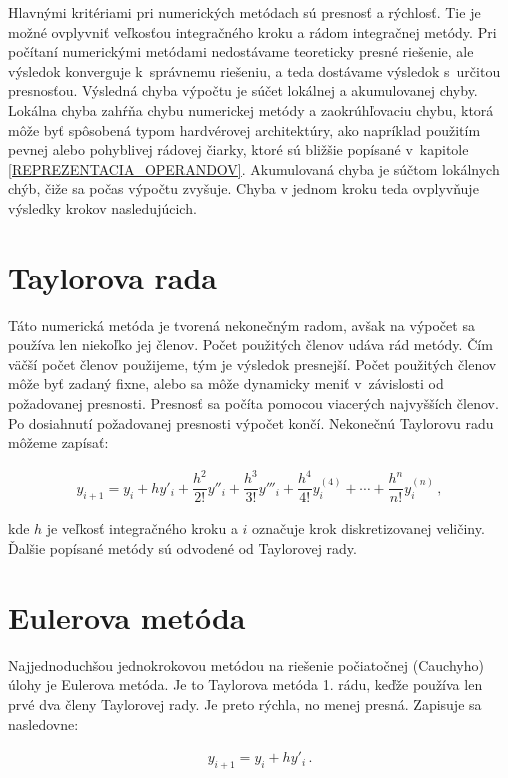 Hlavnými kritériami pri numerických metódach sú presnosť a rýchlosť. Tie je možné ovplyvniť veľkosťou integračného kroku a rádom integračnej metódy. Pri počítaní numerickými metódami nedostávame teoreticky presné riešenie, ale výsledok konverguje k~správnemu riešeniu, a teda dostávame výsledok s~určitou presnosťou. Výsledná chyba výpočtu je súčet lokálnej a akumulovanej chyby.  Lokálna chyba zahŕňa chybu numerickej metódy a zaokrúhľovaciu chybu, ktorá môže byť spôsobená typom hardvérovej architektúry, ako napríklad použitím pevnej alebo pohyblivej rádovej čiarky, ktoré sú bližšie popísané v~kapitole \ref{REPREZENTACIA_OPERANDOV}. Akumulovaná chyba je súčtom lokálnych chýb, čiže sa počas výpočtu zvyšuje. Chyba v jednom kroku teda ovplyvňuje výsledky krokov nasledujúcich.


\section{Taylorova rada}
Táto numerická metóda je tvorená nekonečným radom, avšak na výpočet sa používa len niekoľko jej členov. Počet použitých členov udáva rád metódy. Čím väčší počet členov použijeme, tým je výsledok presnejší. Počet použitých členov môže byť zadaný fixne, alebo sa môže dynamicky meniť v~závislosti od požadovanej presnosti. Presnosť sa počíta pomocou viacerých najvyšších členov. Po dosiahnutí požadovanej presnosti výpočet končí.
Nekonečnú Taylorovu radu môžeme zapísať:

\begin{eqnarray}
y_{i + 1} = y_{i} + h y'_{i} + \dfrac{h^{2}}{2!}y''_{i} + \dfrac{h^{3}}{3!}y'''_{i} + \dfrac{h^{4}}{4!}y^{(4)}_{i} + \cdots + \dfrac{h^{n}}{n!}y_{i}^{(n)} \, , \label{Taylor}
\end{eqnarray}

kde $ h $ je veľkosť integračného kroku a $ i $ označuje krok diskretizovanej veličiny. Ďalšie popísané metódy sú odvodené od Taylorovej rady.


\section{Eulerova metóda}
Najjednoduchšou jednokrokovou metódou na riešenie počiatočnej (Cauchyho) úlohy je Eulerova metóda. Je to Taylorova metóda 1. rádu, keďže používa len prvé dva členy Taylorovej rady. Je preto rýchla, no menej presná. Zapisuje sa nasledovne:

\begin{eqnarray}
y_{i+1} = y_{i} + hy'_{i} \, .
\end{eqnarray}

